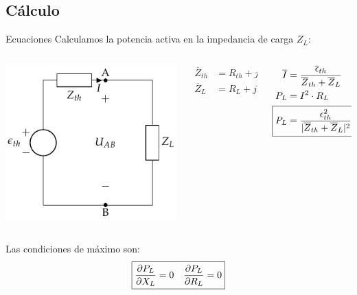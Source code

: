 \documentclass[aspectratio=169, usenames,svgnames,dvipsnames]{beamer}
\begin{document}
\subsection{Cálculo}
\label{sec:org660eb18}
\begin{frame}[label={sec:org6825aa2}]{Ecuaciones}
Calculamos la potencia activa en la impedancia de carga \(Z_L\):
\begin{columns}
\begin{column}{0.3\columnwidth}
\begin{center}
\includegraphics[height=0.45\textheight]{../figs/EquivalenteThevenin.pdf}
\end{center}
\end{column}

\begin{column}{0.2\columnwidth}
\begin{align*}
  \overline{Z}_{th} &= R_{th} + jX_{th}\\
  \overline{Z}_L &= R_L + jX_L\\
\end{align*}
\end{column}

\begin{column}{0.4\columnwidth}
\begin{align*}
\overline{I} &= \frac{\overline{\epsilon}_{th}}{\overline{Z}_{th} + \overline{Z}_L}\\
P_L &= I^2 \cdot R_L\\
\Aboxed{P_L &= \frac{\epsilon^2_{th}}{|\overline{Z}_{th} + \overline{Z}_L|^2} \cdot R_L}
\end{align*}
\end{column}
\end{columns}

Las condiciones de máximo son: 
\[
  \boxed{%
    \diffp{P_L}{X_L} = 0 \quad%
    \diffp{P_L}{R_L} = 0%
  }
\]
\end{frame}
\end{document}
